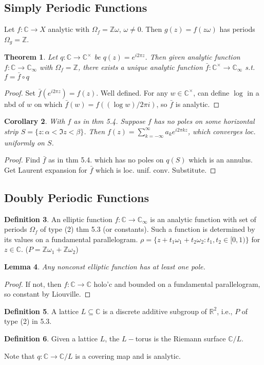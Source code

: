 \documentclass{article}
\theoremstyle{definition}
\newtheorem{defn}{Definition}[section]
\theoremstyle{remark}
\theoremstyle{plain}
\newtheorem{lem}[defn]{Lemma}
\newtheorem{thm}[defn]{Theorem}
\newtheorem{crly}[defn]{Corollary}
\newcommand{\ZZ}{\mathbb{Z}}
\newcommand{\RR}{\mathbb{R}}
\newcommand{\CC}{\mathbb{C}}
\begin{document}
\subsection{Simply Periodic Functions}
Let $f:\CC\to X$ analytic with $\Omega_f=\ZZ\omega$, $\omega\neq 0$. Then $g(z)=f(z\omega)$ has periods $\Omega_g=\ZZ$.
\begin{thm}
    Let $q:\CC\to\CC^\times$ be $q(z)=e^{i2\pi z}$. Then given analytic function $f:\CC\to\CC_\infty$ with $\Omega_f=\ZZ$, there exists a unique analytic function $\bar f:\CC^\times\to \CC_\infty$ s.t. $f=\bar f\circ q$
\end{thm}
\begin{proof}
    Set $\bar f(e^{i2\pi z})=f(z)$. Well defined. For any $w\in\CC^\times$, can define $\log$ in a nbd of $w$ on which $\bar f(w)=f((\log w)/2\pi i)$, so $\bar f$ is analytic.
\end{proof}
\begin{crly}
    With $f$ as in thm 5.4. Suppose $f$ has no poles on some horizontal strip $S=\{z:\alpha<\Im z<\beta\}$. Then $f(z)=\sum_{k=-\infty}^\infty a_ke^{i2\pi kz}$, which converges loc. uniformly on $S$.
\end{crly}
\begin{proof}
    Find $\bar f$ as in thm 5.4. which has no poles on $q(S)$ which is an annulus. Get Laurent expansion for $\bar f$ which is loc. unif. conv. Substitute.
\end{proof}
\subsection{Doubly Periodic Functions}
\begin{defn}
    An elliptic function $f:\CC\to\CC_\infty$ is an analytic function with set of periods $\Omega_f$ of type (2) thm 5.3 (or constants). Such a function is determined by its values on a fundamental parallelogram. $\rho=\{z+t_1\omega_1+t_2\omega_2:t_1,t_2\in[0,1)\}$ for $z\in\CC$. ($P=\ZZ\omega_1+\ZZ\omega_2$)
\end{defn}
\begin{lem}
    Any nonconst elliptic function has at least one pole.
\end{lem}
\begin{proof}
    If not, then $f:\CC\to\CC$ holo'c and bounded on a fundamental parallelogram, so constant by Liouville.
\end{proof}
\begin{defn}
    A lattice $L\subseteq\CC$ is a discrete additive subgroup of $\RR^2$, i.e., $P$ of type (2) in 5.3.
\end{defn}
\begin{defn}
    Given a lattice $L$, the $L-$torus is the Riemann surface $\CC/L$.
\end{defn}
Note that $q:\CC\to \CC/L$ is a covering map and is analytic.
\end{document}
